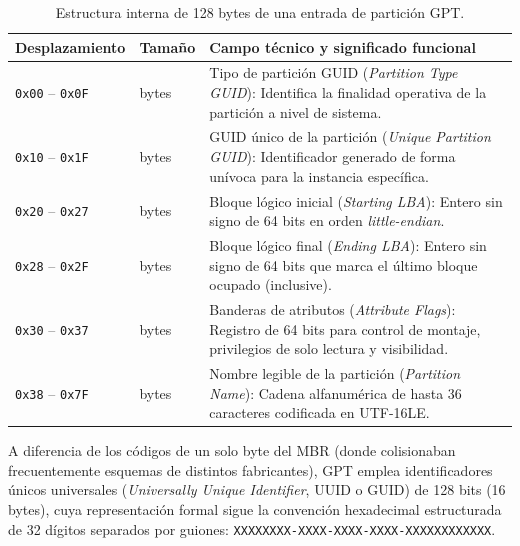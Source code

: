 \documentclass[12pt]{article}
\begin{document}
\begin{table}[!t]
\centering
\small
\renewcommand{\arraystretch}{1.1}
\renewcommand{\tabularxcolumn}[1]{m{#1}}
\setlength{\emergencystretch}{1.5em}
\caption{Estructura interna de 128 bytes de una entrada de partición GPT.}
\label{tab:entradaParticionGpt}
\begin{tabularx}{\textwidth}{>{\centering\arraybackslash}m{3.2cm} >{\centering\arraybackslash}m{1.8cm} X}
\toprule
\textbf{Desplazamiento} & \textbf{Tamaño} & \textbf{Campo técnico y significado funcional} \\
\midrule
\texttt{0x00} -- \texttt{0x0F} & 16 bytes & Tipo de partición GUID (\textit{Partition Type GUID}): Identifica la finalidad operativa de la partición a nivel de sistema. \\
\addlinespace
\texttt{0x10} -- \texttt{0x1F} & 16 bytes & GUID único de la partición (\textit{Unique Partition GUID}): Identificador generado de forma unívoca para la instancia específica. \\
\addlinespace
\texttt{0x20} -- \texttt{0x27} & 8 bytes & Bloque lógico inicial (\textit{Starting LBA}): Entero sin signo de 64 bits en orden \textit{little-endian}. \\
\addlinespace
\texttt{0x28} -- \texttt{0x2F} & 8 bytes & Bloque lógico final (\textit{Ending LBA}): Entero sin signo de 64 bits que marca el último bloque ocupado (inclusive). \\
\addlinespace
\texttt{0x30} -- \texttt{0x37} & 8 bytes & Banderas de atributos (\textit{Attribute Flags}): Registro de 64 bits para control de montaje, privilegios de solo lectura y visibilidad. \\
\addlinespace
\texttt{0x38} -- \texttt{0x7F} & 72 bytes & Nombre legible de la partición (\textit{Partition Name}): Cadena alfanumérica de hasta 36 caracteres codificada en UTF-16LE. \\
\bottomrule
\end{tabularx}
\end{table}

A diferencia de los códigos de un solo byte del MBR (donde colisionaban frecuentemente esquemas de distintos fabricantes), GPT emplea identificadores únicos universales (\textit{Universally Unique Identifier}, UUID o GUID) de 128 bits (16 bytes), cuya representación formal sigue la convención hexadecimal estructurada de 32 dígitos separados por guiones: \texttt{XXXXXXXX-XXXX-XXXX-XXXX-XXXXXXXXXXXX}.
\end{document}
